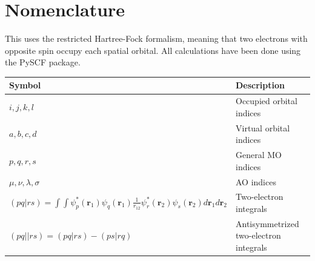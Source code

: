 \documentclass[12pt]{caltech_thesis}
\begin{document}
\tableofcontents
\listoffigures
\listoftables
\printnomenclature

\mainmatter

\chapter{Nomenclature}
This uses the restricted Hartree-Fock formalism, meaning that two electrons with opposite spin occupy each spatial orbital. All calculations have been done using the PySCF package.\autocite{sun_recent_2020}\\
\begin{tabular}{p{} p{}}
Symbol & Description \\
\hline
\(i,j,k,l\) & Occupied orbital indices \\
\(a,b,c,d\) & Virtual orbital indices \\
\(p,q,r,s\) & General MO indices \\
\(\mu,\nu,\lambda,\sigma\) & AO indices \\
\((pq|rs) = \int \int \psi_p^*(\mathbf{r}_1)\psi_q(\mathbf{r}_1)\frac{1}{r_{12}}\psi_r^*(\mathbf{r}_2)\psi_s(\mathbf{r}_2)d\mathbf{r}_1d\mathbf{r}_2\) & Two-electron integrals \\
\((pq||rs) = (pq|rs) - (ps|rq)\) & Antisymmetrized two-electron integrals \\

\end{tabular}
\end{document}
